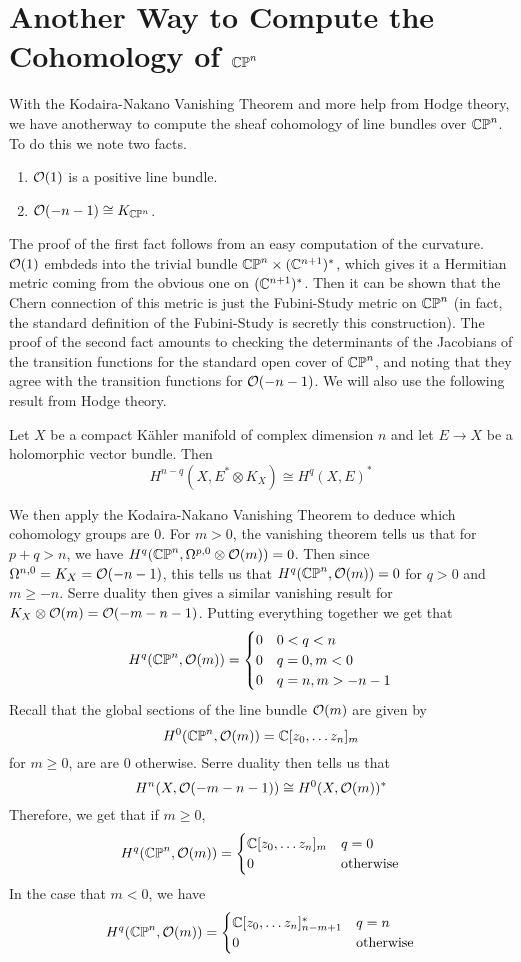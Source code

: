 \section*{Another Way to Compute the Cohomology of $\mathbb{CP}^n$}
%
With the Kodaira-Nakano Vanishing Theorem and more help from Hodge theory, we have
anotherway to compute the sheaf cohomology of line bundles over $\mathbb{CP}^n$. To
do this we note two facts.
\begin{enumerate}
  \item $\mathcal{O}(1)$ is a positive line bundle.
  \item $\mathcal{O}(-n-1) \cong K_{\mathbb{CP}^n}$.
\end{enumerate}
%
The proof of the first fact follows from an easy computation of the curvature.
$\mathcal{O}(1)$ embdeds into the trivial bundle $\mathbb{CP}^n \times (\mathbb{C}^{n+1})^*$, which gives
it a Hermitian metric coming from the obvious one on $(\mathbb{C}^{n+1})^*$. Then it can be
shown that the Chern connection of this metric is just the Fubini-Study metric on
$\mathbb{CP}^n$ (in fact, the standard definition of the Fubini-Study is secretly
this construction). The proof of the second fact amounts to checking the
determinants of the Jacobians of the transition functions for the standard open
cover of $\mathbb{CP}^n$, and noting that they agree with the transition functions
for $\mathcal{O}(-n-1)$. We will also use the following result from Hodge theory.
%
\begin{thm}
Let $X$ be a compact K\"ahler manifold of complex dimension $n$ and let $E \to X$
be a holomorphic vector bundle.
Then
\[
H^{n-q}(X, E^*\otimes K_X) \cong H^q(X,E)^*
\]
\end{thm}
%
We then apply the Kodaira-Nakano Vanishing Theorem to deduce which cohomology
groups are $0$. For $m > 0$, the vanishing theorem tells us that for $p+q > n$, we have
$H^q(\mathbb{CP}^n,\Omega^{p,0} \otimes \mathcal{O}(m)) = 0$. Then since $\Omega^{n,0} = K_X = \mathcal{O}(-n-1)$,
this tells us that $H^q(\mathbb{CP}^n,\mathcal{O}(m)) = 0$ for $q > 0$ and $m \geq -n$. Serre duality
then gives a similar vanishing result for $K_X \otimes \mathcal{O}(m) = \mathcal{O}(-m-n-1)$.
Putting everything together we get that
\[
H^q(\mathbb{CP}^n,\mathcal{O}(m)) = \begin{cases}
0 & 0 < q < n \\
0 & q = 0, m < 0 \\
0 & q = n , m > -n-1
\end{cases}
\]
Recall that the global sections of the line bundle $\mathcal{O}(m)$ are given by
\[
H^0(\mathbb{CP}^n,\mathcal{O}(m)) = \mathbb{C}[z_0,\ldots z_n]_m
\]
for $m \geq 0$, are are $0$ otherwise. Serre duality then tells us that
\[
H^n(X, \mathcal{O}(-m - n - 1)) \cong H^0(X,\mathcal{O}(m))^*
\]
Therefore, we get that if $m \geq 0$,
\[
H^q(\mathbb{CP}^n, \mathcal{O}(m)) = \begin{cases}
\mathbb{C}[z_0,\ldots z_n]_m & q = 0 \\
0 & \text{otherwise}
\end{cases}
\]
In the case that $m < 0$, we have
\[
H^q(\mathbb{CP}^n, \mathcal{O}(m)) = \begin{cases}
\mathbb{C}[z_0,\ldots z_n]_{n-m+1}^* & q = n \\
0 & \text{otherwise}
\end{cases}
\]
%